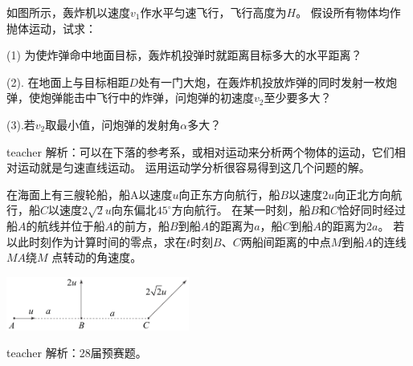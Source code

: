 
\begin{example}
如图所示，轰炸机以速度$v_1$作水平匀速飞行，飞行高度为$H$。
假设所有物体均作抛体运动，试求：

(1) 为使炸弹命中地面目标，轰炸机投弹时就距离目标多大的水平距离？

(2). 在地面上与目标相距$D$处有一门大炮，在轰炸机投放炸弹的同时发射一枚炮弹，使炮弹能击中飞行中的炸弹，问炮弹的初速度$v_2$至少要多大？

(3).若$v_2$取最小值，问炮弹的发射角$\alpha$多大？
\begin{taggedblock}{teacher}
\vspace*{4cm}
\newline
解析：可以在下落的参考系，或相对运动来分析两个物体的运动，它们相对运动就是匀速直线运动。
运用运动学分析很容易得到这几个问题的解。
\end{taggedblock}
\end{example}


\begin{example}
在海面上有三艘轮船，船A以速度$u$向正东方向航行，船$B$以速度$2u$向正北方向航行，船$C$以速度$2\sqrt{2}u$向东偏北$45^\circ$方向航行。
在某一时刻，船$B$和$C$恰好同时经过船$A$的航线并位于船$A$的前方，船$B$到船$A$的距离为$a$，船$C$到船$A$的距离为$2a$。
若以此时刻作为计算时间的零点，求在$t$时刻$B$、$C$两船间距离的中点$M$到船$A$的连线$MA$绕$M$ 点转动的角速度。

\begin{flushright}
\includegraphics[width = 0.45\textwidth]{images/motion-problem-40.pdf} 
\end{flushright}
\begin{taggedblock}{teacher}
\noindent
解析：28届预赛题。
\end{taggedblock}
\end{example}



